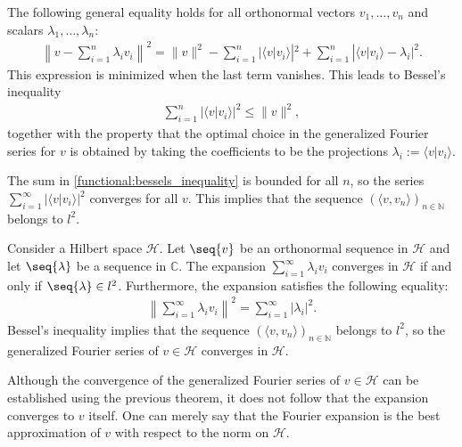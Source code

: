     \begin{property}
        The following general equality holds for all orthonormal vectors $v_1,\ldots,v_n$ and scalars $\lambda_1,\ldots,\lambda_n$:
        \begin{gather}
            \left\|v - \sum_{i=1}^n\lambda_iv_i\right\|^2 = \|v\|^2 - \sum_{i=1}^n|\langle v|v_i \rangle|^2 + \sum_{i=1}^n|\langle v|v_i \rangle - \lambda_i|^2.
        \end{gather}
        This expression is minimized when the last term vanishes. This leads to Bessel's inequality
        \begin{gather}
            \label{functional:bessels_inequality}
            \sum_{i=1}^n|\langle v|v_i \rangle|^2\leq\|v\|^2,
        \end{gather}
        together with the property that the optimal choice in the generalized Fourier series for $v$ is obtained by taking the coefficients to be the projections $\lambda_i:=\langle v|v_i \rangle$.
    \end{property}
    \begin{result}
        The sum in \eqref{functional:bessels_inequality} is bounded for all $n$, so the series $\sum_{i=1}^\infty|\langle v|v_i \rangle|^2$ converges for all $v$. This implies that the sequence $(\langle v,v_n\rangle)_{n\in\mathbb{N}}$ belongs to $l^2$.
    \end{result}

    \begin{theorem}
        Consider a Hilbert space $\mathcal{H}$. Let $\seq{v}$ be an orthonormal sequence in $\mathcal{H}$ and let $\seq{\lambda}$ be a sequence in $\mathbb{C}$. The expansion $\sum_{i=1}^\infty\lambda_iv_i$ converges in $\mathcal{H}$ if and only if $\seq{\lambda}\in l^2$. Furthermore, the expansion satisfies the following equality:
        \begin{gather}
            \left\|\sum_{i=1}^\infty\lambda_iv_i\right\|^2 = \sum_{i=1}^\infty|\lambda_i|^2.
        \end{gather}
        Bessel's inequality implies that the sequence $(\langle v,v_n \rangle)_{n\in\mathbb{N}}$ belongs to $l^2$, so the generalized Fourier series of $v\in\mathcal{H}$ converges in $\mathcal{H}$.
    \end{theorem}
    \begin{remark}
        Although the convergence of the generalized Fourier series of $v\in\mathcal{H}$ can be established using the previous theorem, it does not follow that the expansion converges to $v$ itself. One can merely say that the Fourier expansion is the best approximation of $v$ with respect to the norm on $\mathcal{H}$.
    \end{remark}

